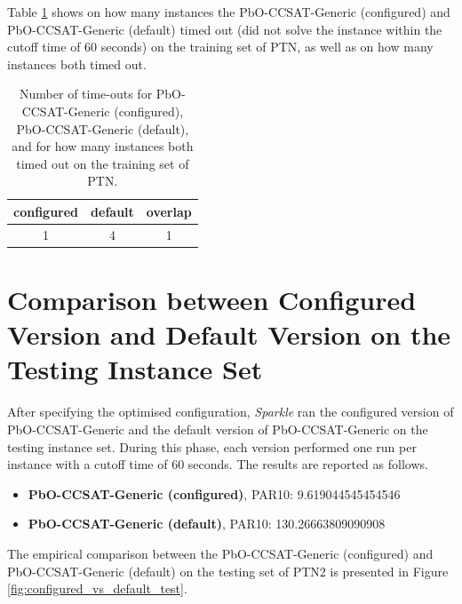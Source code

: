 \documentclass[british]{article}
\newif\iftest
\newif\ifruntime
\begin{document}

Table \ref{tbl:timeouts_train} shows on how many instances the PbO-CCSAT-Generic (configured) and PbO-CCSAT-Generic (default) timed out (did not solve the instance within the cutoff time of 60 seconds) on the training set of PTN, as well as on how many instances both timed out.

    \begin{table}[htbp]
        \centering
            \begin{tabular}{ccc}
                configured & default & overlap \\ \hline
                1 & 4 & 1
            \end{tabular}
            \caption{Number of time-outs for PbO-CCSAT-Generic (configured), PbO-CCSAT-Generic (default), and for how many instances both timed out on the training set of PTN.}
        \label{tbl:timeouts_train}
    \end{table}


\iftest
    \section{Comparison between Configured Version and Default Version on the Testing Instance Set}

    After specifying the optimised configuration, \emph{Sparkle} ran the configured version of PbO-CCSAT-Generic and the default version of PbO-CCSAT-Generic on the testing instance set. During this phase, each version performed one run per instance with a cutoff time of 60 seconds. The results are reported as follows.

    \begin{itemize}
        \item \textbf{PbO-CCSAT-Generic (configured)}, PAR10: 9.619044545454546
        \item \textbf{PbO-CCSAT-Generic (default)}, PAR10: 130.26663809090908
    \end{itemize}

    The empirical comparison between the PbO-CCSAT-Generic (configured) and PbO-CCSAT-Generic (default) on the testing set of PTN2 is presented in Figure \ref{fig:configured_vs_default_test}.
\end{document}
